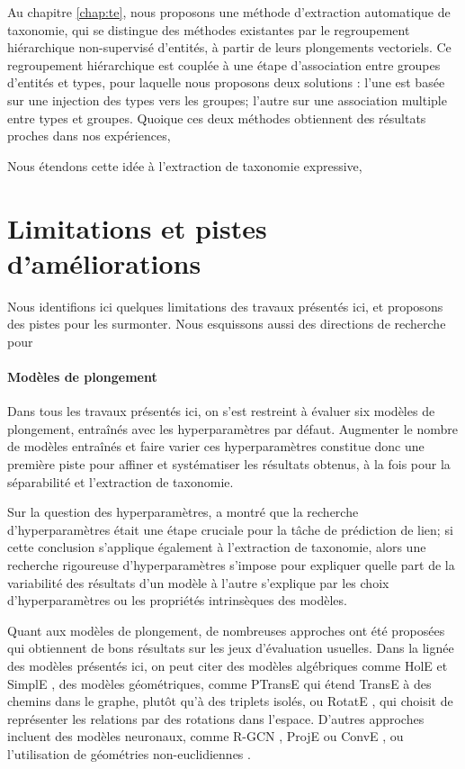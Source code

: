 Au chapitre \ref{chap:te}, nous proposons une méthode d'extraction automatique de taxonomie, qui se distingue des méthodes existantes par le regroupement hiérarchique non-supervisé d'entités, à partir de leurs plongements vectoriels. Ce regroupement hiérarchique est couplée à une étape d'association entre groupes d'entités et types, pour laquelle nous proposons deux solutions : l'une est basée sur une injection des types vers les groupes; l'autre sur une association multiple entre types et groupes. Quoique ces deux méthodes obtiennent des résultats proches dans nos expériences, 

Nous étendons cette idée à l'extraction de taxonomie expressive, 

\section{Limitations et pistes d'améliorations}

Nous identifions ici quelques limitations des travaux présentés ici, et proposons des pistes pour les surmonter. Nous esquissons aussi des directions de recherche pour 


\paragraph{Modèles de plongement}

Dans tous les travaux présentés ici, on s'est restreint à évaluer six modèles de plongement, entraînés avec les hyperparamètres par défaut. Augmenter le nombre de modèles entraînés et faire varier ces hyperparamètres constitue donc une première piste pour affiner et systématiser les résultats obtenus, à la fois pour la séparabilité et l'extraction de taxonomie. 

Sur la question des hyperparamètres, \cite{kadlec2017knowledge} a montré que la recherche d'hyperparamètres était une étape cruciale pour la tâche de prédiction de lien; si cette conclusion s'applique également à l'extraction de taxonomie, alors une recherche rigoureuse d'hyperparamètres s'impose pour expliquer quelle part de la variabilité des résultats d'un modèle à l'autre s'explique par les choix d'hyperparamètres ou les propriétés intrinsèques des modèles.

Quant aux modèles de plongement, de nombreuses approches ont été proposées qui obtiennent de bons résultats sur les jeux d'évaluation usuelles. Dans la lignée des modèles présentés ici, on peut citer des modèles algébriques comme HolE \cite{hole2016} et SimplE \cite{simple2018}, des modèles géométriques, comme PTransE \cite{ptranse} qui étend TransE à des chemins dans le graphe, plutôt qu'à des triplets isolés, ou RotatE \cite{rotate2019}, qui choisit de représenter les relations par des rotations dans l'espace. D'autres approches incluent des modèles neuronaux, comme R-GCN \cite{rgcn2018}, ProjE \cite{proje2017} ou ConvE \cite{conve2018}, ou l'utilisation de géométries non-euclidiennes \cite{nickel2017poincare, nickel2018learning}.

